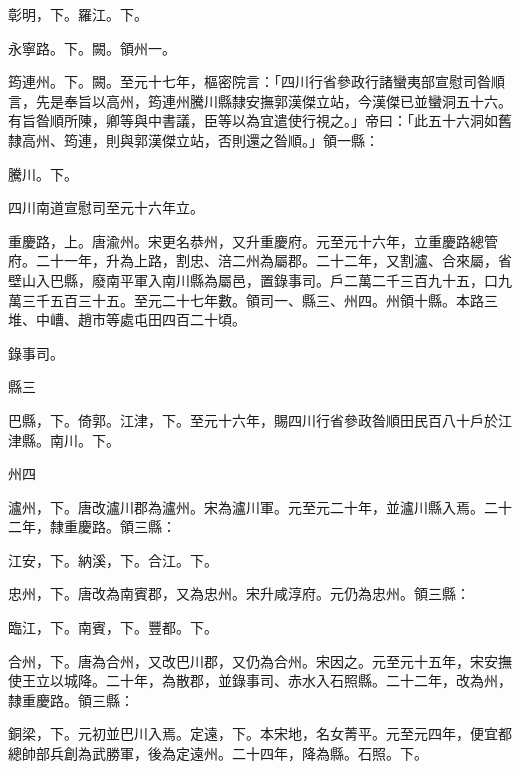 \begin{pinyinscope}
 彰明，下。羅江。下。



 永寧路。下。闕。領州一。



 筠連州。下。闕。至元十七年，樞密院言：「四川行省參政行諸蠻夷部宣慰司昝順言，先是奉旨以高州，筠連州騰川縣隸安撫郭漢傑立站，今漢傑已並蠻洞五十六。有旨昝順所陳，卿等與中書議，臣等以為宜遣使行視之。」帝曰：「此五十六洞如舊隸高州、筠連，則與郭漢傑立站，否則還之昝順。」領一縣：



 騰川。下。



 四川南道宣慰司至元十六年立。



 重慶路，上。唐渝州。宋更名恭州，又升重慶府。元至元十六年，立重慶路總管府。二十一年，升為上路，割忠、涪二州為屬郡。二十二年，又割瀘、合來屬，省壁山入巴縣，廢南平軍入南川縣為屬邑，置錄事司。戶二萬二千三百九十五，口九萬三千五百三十五。至元二十七年數。領司一、縣三、州四。州領十縣。本路三堆、中嶆、趙市等處屯田四百二十頃。



 錄事司。



 縣三



 巴縣，下。倚郭。江津，下。至元十六年，賜四川行省參政昝順田民百八十戶於江津縣。南川。下。



 州四



 瀘州，下。唐改瀘川郡為瀘州。宋為瀘川軍。元至元二十年，並瀘川縣入焉。二十二年，隸重慶路。領三縣：



 江安，下。納溪，下。合江。下。



 忠州，下。唐改為南賓郡，又為忠州。宋升咸淳府。元仍為忠州。領三縣：



 臨江，下。南賓，下。豐都。下。



 合州，下。唐為合州，又改巴川郡，又仍為合州。宋因之。元至元十五年，宋安撫使王立以城降。二十年，為散郡，並錄事司、赤水入石照縣。二十二年，改為州，隸重慶路。領三縣：



 銅梁，下。元初並巴川入焉。定遠，下。本宋地，名女菁平。元至元四年，便宜都總帥部兵創為武勝軍，後為定遠州。二十四年，降為縣。石照。下。




\end{pinyinscope}
